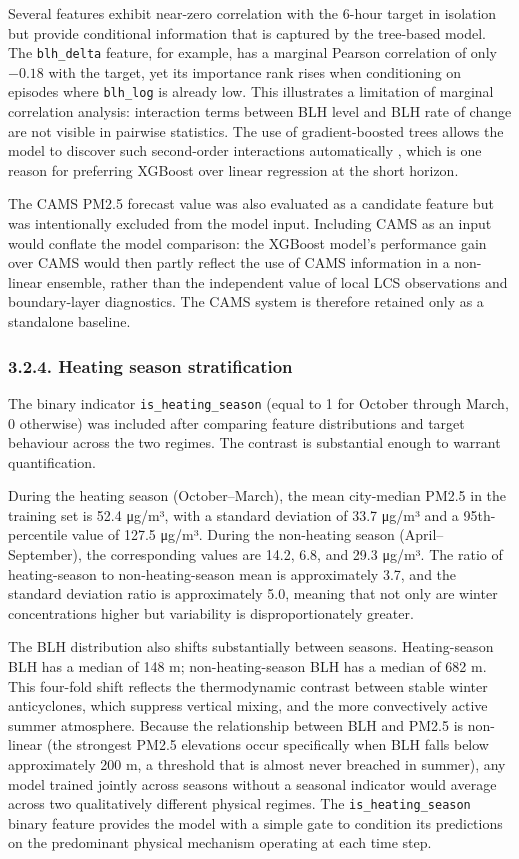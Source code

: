 Several features exhibit near-zero correlation with the 6-hour target in isolation but provide conditional information that is captured by the tree-based model. The \texttt{blh\_delta} feature, for example, has a marginal Pearson correlation of only \(-0.18\) with the target, yet its importance rank rises when conditioning on episodes where \texttt{blh\_log} is already low. This illustrates a limitation of marginal correlation analysis: interaction terms between BLH level and BLH rate of change are not visible in pairwise statistics. The use of gradient-boosted trees allows the model to discover such second-order interactions automatically \cite{Friedman2001GBM}, which is one reason for preferring XGBoost over linear regression at the short horizon.

The CAMS PM2.5 forecast value was also evaluated as a candidate feature but was intentionally excluded from the model input. Including CAMS as an input would conflate the model comparison: the XGBoost model's performance gain over CAMS would then partly reflect the use of CAMS information in a non-linear ensemble, rather than the independent value of local LCS observations and boundary-layer diagnostics. The CAMS system is therefore retained only as a standalone baseline.

\subsubsection{3.2.4. Heating season stratification}\label{heating-season-stratification}

The binary indicator \texttt{is\_heating\_season} (equal to 1 for October through March, 0 otherwise) was included after comparing feature distributions and target behaviour across the two regimes. The contrast is substantial enough to warrant quantification.

During the heating season (October--March), the mean city-median PM2.5 in the training set is 52.4 μg/m³, with a standard deviation of 33.7 μg/m³ and a 95th-percentile value of 127.5 μg/m³. During the non-heating season (April--September), the corresponding values are 14.2, 6.8, and 29.3 μg/m³. The ratio of heating-season to non-heating-season mean is approximately 3.7, and the standard deviation ratio is approximately 5.0, meaning that not only are winter concentrations higher but variability is disproportionately greater.

The BLH distribution also shifts substantially between seasons. Heating-season BLH has a median of 148 m; non-heating-season BLH has a median of 682 m. This four-fold shift reflects the thermodynamic contrast between stable winter anticyclones, which suppress vertical mixing, and the more convectively active summer atmosphere. Because the relationship between BLH and PM2.5 is non-linear (the strongest PM2.5 elevations occur specifically when BLH falls below approximately 200 m, a threshold that is almost never breached in summer), any model trained jointly across seasons without a seasonal indicator would average across two qualitatively different physical regimes. The \texttt{is\_heating\_season} binary feature provides the model with a simple gate to condition its predictions on the predominant physical mechanism operating at each time step.


